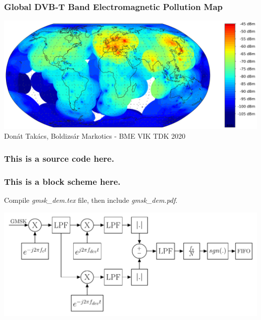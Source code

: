 \documentclass{beamer}
\begin{document}
\begin{frame}
\transduration{\slidetime}
\frametitle{Global DVB-T Band Electromagnetic Pollution Map}
\centering
\includegraphics[width=1.05\textwidth]{pollution_map.png}\\
Donát Takács, Boldizsár Markotics - BME VIK TDK 2020\\
\end{frame}

\begin{frame}
\transduration{\slidetime}
\frametitle{This is a source code here.}
\centering

\end{frame}

\begin{frame}
\transduration{\slidetime}
\frametitle{This is a block scheme here.}
\centering
Compile \textit{gmsk\_dem.tex} file, then include \textit{gmsk\_dem.pdf}.

\vspace{5mm}
\includegraphics[width=1.0\textwidth]{gmsk_dem.pdf}
\end{frame}
\end{document}
